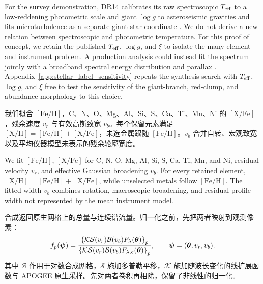 \begin{EN}
For the survey demonstration, DR14 calibrates its raw spectroscopic $T_{\rm eff}$ to a
low-reddening photometric scale and giant $\log g$ to asteroseismic gravities
and fits microturbulence as a separate giant-star coordinate
\citep{Holtzman2018}. We do not derive a new relation between spectroscopic and
photometric temperature. For this proof of concept, we retain the published
$T_{\rm eff}$, $\log g$, and $\xi$ to isolate the many-element and instrument
problem. A production analysis could instead fit the spectrum jointly with a
broadband spectral energy distribution and parallax \citep{Cargile2020}.
Appendix~\ref{app:stellar_label_sensitivity} repeats the synthesis
search with $T_{\rm eff}$, $\log g$, and $\xi$ free to test the sensitivity of
the giant-branch, red-clump, and abundance morphology to this choice.
\end{EN}

我们拟合 $[\mathrm{Fe}/\mathrm{H}]$，C、N、O、Mg、Al、Si、S、Ca、Ti、Mn、Ni 的 $[\mathrm{X}/\mathrm{Fe}]$，残余速度 $v_r$ 与有效高斯致宽 $v_b$。每个保留元素满足 $[\mathrm{X}/\mathrm{H}]=[\mathrm{Fe}/\mathrm{H}]+[\mathrm{X}/\mathrm{Fe}]$，未选金属跟随 $[\mathrm{Fe}/\mathrm{H}]$。$v_b$ 合并自转、宏观致宽以及平均仪器模型未表示的残余轮廓宽度。

\begin{EN}
We fit $[\mathrm{Fe}/\mathrm{H}]$, $[\mathrm{X}/\mathrm{Fe}]$ for C, N, O,
Mg, Al, Si, S, Ca, Ti, Mn, and Ni, residual velocity $v_r$, and effective
Gaussian broadening $v_b$. For every retained element,
$[\mathrm{X}/\mathrm{H}]=[\mathrm{Fe}/\mathrm{H}]+[\mathrm{X}/\mathrm{Fe}]$,
while unselected metals follow $[\mathrm{Fe}/\mathrm{H}]$. The fitted width
$v_b$ combines rotation, macroscopic broadening, and residual profile width not
represented by the mean instrument model.
\end{EN}

合成返回原生网格上的总量与连续谱流量。归一化之前，先把两者映射到观测像素：
\begin{equation}
f_p(\boldsymbol{\psi})=
\frac{\left\{\mathcal{K}\mathcal{S}(v_r)\mathcal{B}(v_b)
F_\lambda(\boldsymbol{\theta})\right\}_p}
{\left\{\mathcal{K}\mathcal{S}(v_r)\mathcal{B}(v_b)
F_{\lambda,{\rm c}}(\boldsymbol{\theta})\right\}_p},
\qquad
\boldsymbol{\psi}=(\boldsymbol{\theta},v_r,v_b).
\end{equation}
\noindent 其中 $\mathcal{B}$ 作用于对数合成网格，$\mathcal{S}$ 施加多普勒平移，$\mathcal{K}$ 施加随波长变化的线扩展函数与 APOGEE 原生采样。先对两者卷积再相除，保留了非线性的归一化。

